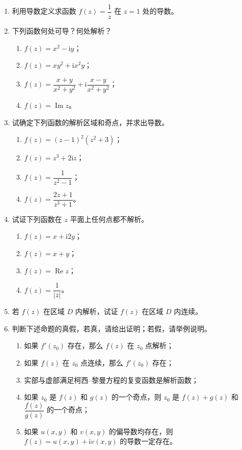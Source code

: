 \documentclass[UTF8,11pt,a4paper]{ctexart}
\newcommand{\ii}{\mathrm{i}}
\newcommand{\Ree}{\operatorname{Re}}
\newcommand{\Imm}{\operatorname{Im}}
\begin{document}
\begin{enumerate}
\item 利用导数定义求函数 $f(z)=\dfrac1z$ 在 $z=1$ 处的导数。

\item 下列函数何处可导？何处解析？
  \begin{enumerate}
  \item $f(z)=x^2-\ii y$；
  \item $f(z)=xy^2+\ii x^2y$；
  \item $f(z)=\dfrac{x+y}{x^2+y^2}+\ii\dfrac{x-y}{x^2+y^2}$；
  \item $f(z)=\Imm z$。
  \end{enumerate}

\item 试确定下列函数的解析区域和奇点，并求出导数。
  \begin{enumerate}
  \item $f(z)=(z-1)^2(z^2+3)$；
  \item $f(z)=z^3+2\ii z$；
  \item $f(z)=\dfrac1{z^2-1}$；
  \item $f(z)=\dfrac{2z+1}{z^3+1}$。
  \end{enumerate}

\item 试证下列函数在 $z$ 平面上任何点都不解析。
  \begin{enumerate}
  \item $f(z)=x+\ii2y$；
  \item $f(z)=x+y$；
  \item $f(z)=\Ree z$；
  \item $f(z)=\dfrac1{|\overline z|}$。
  \end{enumerate}

\item 若 $f(z)$ 在区域 $D$ 内解析，试证 $f(z)$ 在区域 $D$ 内连续。

\item 判断下述命题的真假，若真，请给出证明；若假，请举例说明。
  \begin{enumerate}
  \item 如果 $f'(z_0)$ 存在，那么 $f(z)$ 在 $z_0$ 点解析；
  \item 如果 $f(z)$ 在 $z_0$ 点连续，那么 $f'(z_0)$ 存在；
  \item 实部与虚部满足柯西--黎曼方程的复变函数是解析函数；
  \item 如果 $z_0$ 是 $f(z)$ 和 $g(z)$ 的一个奇点，则 $z_0$ 是 $f(z)+g(z)$ 和 $\dfrac{f(z)}{g(z)}$ 的一个奇点；
  \item 如果 $u(x,y)$ 和 $v(x,y)$ 的偏导数均存在，则 $f(z)=u(x,y)+\ii v(x,y)$ 的导数一定存在。
  \end{enumerate}


\end{enumerate}
\end{document}
